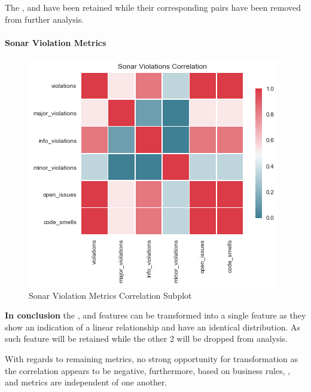 The \complexity{}, \linesToCover{} and \ncloc{} have been retained while their corresponding pairs have been removed from further analysis.
\FloatBarrier

\paragraph{Sonar Violation Metrics}\label{sec:impl-data-analysis:corr:sonar-violations}

\begin{figure}
    \centering
    \includegraphics[scale=0.9]{Figures/correlation/Sonar_Violations_Correlation.png}
    \caption{Sonar Violation Metrics Correlation Subplot}
    \label{fig:correlation-sonar-violation-metrics-subplot}
\end{figure}

\textbf{In conclusion} 
the \openIssues{}, \codeSmells{} and \violations features can be transformed into a single feature as they show an indication of a linear relationship and have an identical distribution. As such \violations{} feature will be retained while the other 2 will be dropped from analysis.

With regards to remaining metrics, no strong opportunity for transformation as the correlation appears to be negative, furthermore, based on business rules, \infoViolations{}, \minorViolations{} and \majorViolations{} metrics are independent of one another.
\FloatBarrier
\newpage

